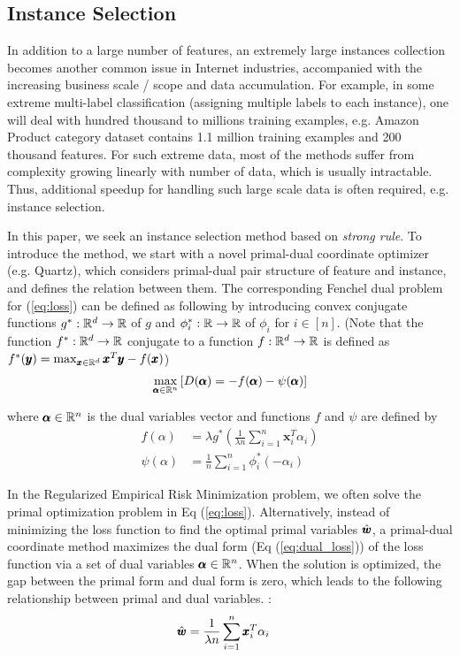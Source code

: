 \subsection{Instance Selection}

In addition to a large number of features, an extremely large instances collection becomes another common issue in Internet industries, accompanied with the increasing business scale / scope and data accumulation. For example, in some extreme multi-label classification\cite{wang2019ranking} (assigning multiple labels to each instance), one will deal with hundred thousand to millions training examples, e.g. Amazon Product category dataset\cite{mcauley2013hidden} contains 1.1 million training examples and 200 thousand features. For such extreme data, most of the methods suffer from complexity growing linearly with number of data, which is usually intractable. Thus, additional speedup for handling such large scale data is often required, e.g. instance selection.

In this paper, we seek an instance selection method based on \textit{strong rule}. To introduce the method, we start with a novel primal-dual coordinate optimizer (e.g. Quartz\cite{qu2015quartz}), which considers primal-dual pair structure of feature and instance, and defines the relation between them. The corresponding Fenchel dual problem for (\ref{eq:loss}) can be defined as following by introducing convex conjugate functions $g^\ast: \mathbb{R}^d \to \mathbb{R}$ of $g$  and $\phi_i^\ast : \mathbb{R} \to \mathbb{R}$ of $\phi_i$ for $i \in [n]$. (Note that the function $f^{\ast}: \mathbb{R}^d \to \mathbb{R}$ conjugate to a function $f: \mathbb{R}^d \to \mathbb{R}$ is defined as $f^\ast(\pmb{y}) = \max_{\pmb{x}\in \mathbb{R}^d} \pmb{x}^T \pmb{y} - f(\pmb{x})$)
\begin{align}
\max_{\pmb{\alpha} \in \mathbb{R}^n} \left[ D(\pmb{\alpha}) = -f(\pmb{\alpha}) - \psi(\pmb{\alpha}) \right] \label{eq:dual_loss}
\end{align}

where $\pmb{\alpha} \in \mathbb{R}^n$ is the dual variables vector and functions $f$ and $\psi$ are defined by
\begin{align}
f(\alpha) &= \lambda g^\ast \left( \frac{1}{\lambda n} \sum_{i=1}^n \pmb{x}_i^T  \alpha_i\right) \label{eq:conjugate_g} \\
\psi(\alpha) &= \frac{1}{n} \sum_{i=1}^{n} \phi_i^\ast (- \alpha_i) \label{eq:conjugate_phi}
\end{align}


In the Regularized Empirical Risk Minimization problem, we often solve the primal optimization problem in Eq (\ref{eq:loss}). Alternatively, instead of minimizing the loss function to find the optimal primal variables $\hat{\pmb{w}}$, a primal-dual coordinate method maximizes the dual form (Eq (\ref{eq:dual_loss})) of the loss function via a set of dual variables $\pmb{\alpha} \in \mathbb{R}^{n}$. When the solution is optimized, the gap between the primal form and dual form is zero, which leads to the following relationship between primal and dual variables. \cite{yen2016pd,qu2015quartz}:
\begin{align}
    \hat{\pmb{w}} &= \frac{1}{\lambda n} \sum_{i=1}^{n} \pmb{x}_i^T \alpha_i
\end{align}


